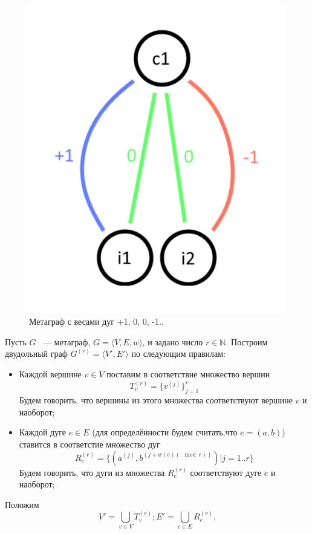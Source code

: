 \documentclass[14pt]{mmcs-article}
\begin{document}
\begin{figure}[H]
    \centering
    \includegraphics[scale=0.4]{Fig_2.png}
    \caption{ Метаграф с весами дуг +1, 0, 0, -1.. }
    \label{image:2}
\end{figure}

Пусть $G$ ~--- метаграф, $G = \langle V, E, w \rangle$, и задано число $r \in \mathbb{N}$. Построим двудольный граф $G^{(r)} = \langle V', E' \rangle$ по следующим правилам:

\begin{itemize}
    \item Каждой вершине $v \in V$ поставим в соответствие множество вершин
    \[
        T^{(r)}_v = \{ v^{(j)} \}_{j = 1}^r
    \]
    Будем говорить, что вершины из этого множества соответствуют вершине $v$ и наоборот;

    \item Каждой дуге $e \in E$ (для определённости будем считать,что $e = (a, b)$) ставится в соответстие множество дуг
    \[
        R^{(r)}_e = \{ (a^{(j)}, b^{(j + w(e) (\mod{r}))}) | j = 1..r \}
    \]
    Будем говорить, что дуги из множества $R^{(r)}_e$ соответствуют дуге $e$ и наоборот;
\end{itemize}
Положим
\[
    V' = \bigcup_{v \in V} T^{(r)}_v; E' = \bigcup_{e \in E} R^{(r)}_e.
\]
\end{document}

